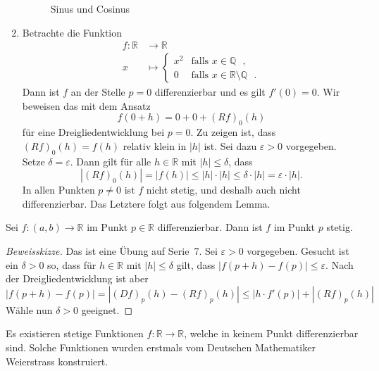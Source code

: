 \documentclass[../main.tex]{subfiles}
\begin{document}
\begin{examples}
\begin{enumerate}[(1)]
      \begin{figure}[htb]
        \centering
        
        \caption{Sinus und Cosinus}%
        \label{fig:sine}
      \end{figure}
    \item Betrachte die Funktion
      \begin{align*}
        f \colon \mathbb{R} & \to \mathbb{R} \\
        x & \mapsto 
        \begin{cases}
          x^2 & \text{falls $x \in \mathbb{Q}$ }, \\
          0 & \text{falls $x \in \mathbb{R} \setminus \mathbb{Q}$ }.
        \end{cases}
      \end{align*}
      Dann ist $f$ an der Stelle $p = 0$ differenzierbar
      und es gilt $f'(0) = 0$. Wir beweisen das mit dem Ansatz
        \[
          f(0 + h) = 0 + 0 + {(Rf)}_0(h)
        \]
      für eine Dreigliedentwicklung bei $p = 0$.
      Zu zeigen ist, dass ${(Rf)}_0(h) = f(h)$ 
      relativ klein in $|h|$ ist.
      Sei dazu $\varepsilon > 0$ vorgegeben.
      Setze $\delta = \varepsilon$.
      Dann gilt für alle $h \in \mathbb{R}$ mit $|h| \leq \delta$,
      dass
      \[
        |{(Rf)}_0(h)| = |f(h)| \leq |h| \cdot |h| \leq \delta \cdot |h|
        = \varepsilon \cdot |h|.
      \]
      In allen Punkten $p \neq 0$ ist $f$ nicht stetig,
      und deshalb auch nicht differenzierbar. Das Letztere
      folgt aus folgendem Lemma.
  \end{enumerate}
\end{examples}

\begin{lemma*}
  Sei $f \colon (a, b) \to \mathbb{R}$ im Punkt $p \in \mathbb{R}$ 
  differenzierbar. Dann ist $f$ im Punkt $p$ stetig.
\end{lemma*}

\begin{proof}[Beweisskizze]
  Das ist eine Übung auf Serie~7.
  Sei $\varepsilon > 0$ vorgegeben. Gesucht
  ist ein $\delta > 0$ so, dass für $h \in \mathbb{R}$ 
  mit $|h| \leq \delta$ gilt, dass
  $|f(p+h) - f(p)| \leq \varepsilon$.
  Nach der Dreigliedentwicklung ist aber
  \[
    |f(p + h) - f(p)| = |{(Df)}_p(h) - {(Rf)}_p(h)|
    \leq |h \cdot f'(p)| + |{(Rf)}_p(h)|
  \]
  Wähle nun $\delta > 0$ geeignet.
\end{proof}

\begin{remark}
  Es existieren stetige Funktionen $f \colon \mathbb{R} \to \mathbb{R}$,
  welche in keinem Punkt differenzierbar sind.
  Solche Funktionen wurden erstmals vom Deutschen Mathematiker
  Weierstrass konstruiert.
\end{remark}
\end{document}
